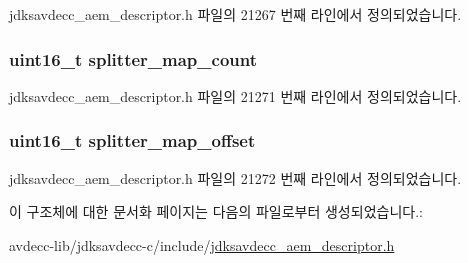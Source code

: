 jdksavdecc\+\_\+aem\+\_\+descriptor.\+h 파일의 21267 번째 라인에서 정의되었습니다.

\subsubsection[{\texorpdfstring{splitter\+\_\+map\+\_\+count}{splitter_map_count}}]{\setlength{\rightskip}{0pt plus 5cm}uint16\+\_\+t splitter\+\_\+map\+\_\+count}\hypertarget{structjdksavdecc__descriptor__signal__splitter_aebf6a6b0659a75f9a4eea6629f987cac}{}\label{structjdksavdecc__descriptor__signal__splitter_aebf6a6b0659a75f9a4eea6629f987cac}


jdksavdecc\+\_\+aem\+\_\+descriptor.\+h 파일의 21271 번째 라인에서 정의되었습니다.

\subsubsection[{\texorpdfstring{splitter\+\_\+map\+\_\+offset}{splitter_map_offset}}]{\setlength{\rightskip}{0pt plus 5cm}uint16\+\_\+t splitter\+\_\+map\+\_\+offset}\hypertarget{structjdksavdecc__descriptor__signal__splitter_aed40a18f33bb308d5d9c862701af62fe}{}\label{structjdksavdecc__descriptor__signal__splitter_aed40a18f33bb308d5d9c862701af62fe}


jdksavdecc\+\_\+aem\+\_\+descriptor.\+h 파일의 21272 번째 라인에서 정의되었습니다.



이 구조체에 대한 문서화 페이지는 다음의 파일로부터 생성되었습니다.\+:\begin{DoxyCompactItemize}
\item 
avdecc-\/lib/jdksavdecc-\/c/include/\hyperlink{jdksavdecc__aem__descriptor_8h}{jdksavdecc\+\_\+aem\+\_\+descriptor.\+h}\end{DoxyCompactItemize}
